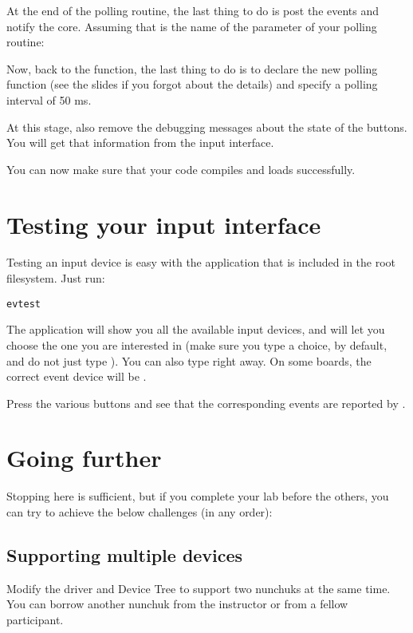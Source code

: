 At the end of the polling routine, the last thing to do is post the events
and notify the  core. Assuming that  is the
name of the  parameter of your polling routine:


Now, back to the  function, the last thing to do
is to declare the new polling function (see the slides if you forgot
about the details) and specify a polling interval of 50 ms.

At this stage, also remove the debugging messages about the state
of the buttons. You will get that information from the input interface.

You can now make sure that your code compiles and loads successfully.

\section{Testing your input interface}

Testing an input device is easy with the  application
that is included in the root filesystem. Just run:

\begin{verbatim}
evtest
\end{verbatim}

The application will show you all the available input devices, and will let
you choose the one you are interested in (make sure you type a choice,
 by default, and do not just type \code{[Enter]}). You can also
type  right away. On some boards, the correct
event device will be .

Press the various buttons and see that the corresponding events are
reported by .

\section{Going further}

Stopping here is sufficient, but if you complete your lab before the
others, you can try to achieve the below challenges (in any order):

\subsection{Supporting multiple devices}

Modify the driver and Device Tree to support two nunchuks at the same
time. You can borrow another nunchuk from the instructor or from a fellow
participant.

